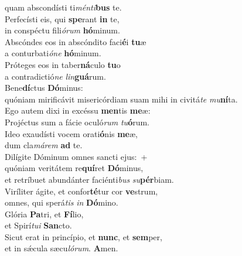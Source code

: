 \oddverse quam abscondísti ti\textit{mén}\textit{ti}\textbf{bus} te.\\
\evenverse Perfecísti eis, qui \textbf{spe}rant \textbf{in} te,~\*\\
\evenverse in conspéctu fili\textit{ó}\textit{rum} \textbf{hó}minum.\\
\oddverse Abscóndes eos in abscóndito faci\textbf{é}i \textbf{tu}æ~\*\\
\oddverse a conturbati\textit{ó}\textit{ne} \textbf{hó}minum.\\
\evenverse Próteges eos in taber\textbf{ná}culo \textbf{tu}o~\*\\
\evenverse a contradictió\textit{ne} \textit{lin}\textbf{guá}rum.\\
\oddverse Bene\textbf{dí}ctus \textbf{Dó}minus:~\*\\
\oddverse quóniam mirificávit misericórdiam suam mihi in civitá\textit{te} \textit{mu}\textbf{ní}ta.\\
\evenverse Ego autem dixi in excéssu \textbf{men}tis \textbf{me}æ:~\*\\
\evenverse Projéctus sum a fácie oculó\textit{rum} \textit{tu}\textbf{ó}rum.\\
\oddverse Ideo exaudísti vocem orati\textbf{ó}nis \textbf{me}æ,~\*\\
\oddverse dum cla\textit{má}\textit{rem} \textbf{ad} te.\\
\evenverse Dilígite Dóminum omnes sancti ejus:~+\\
\evenverse  quóniam veritátem re\textbf{quí}ret \textbf{Dó}minus,~\*\\
\evenverse et retríbuet abundánter faciénti\textit{bus} \textit{su}\textbf{pér}biam.\\
\oddverse Viríliter ágite, et confor\textbf{té}tur cor \textbf{ve}strum,~\*\\
\oddverse omnes, qui sperá\textit{tis} \textit{in} \textbf{Dó}mino.\\
\evenverse Glória \textbf{Pa}tri, et \textbf{Fí}lio,~\*\\
\evenverse et Spirí\textit{tu}\textit{i} \textbf{San}cto.\\
\oddverse Sicut erat in princípio, et \textbf{nunc}, et \textbf{sem}per,~\*\\
\oddverse et in sǽcula sæcu\textit{ló}\textit{rum}. \textbf{A}men.\\
